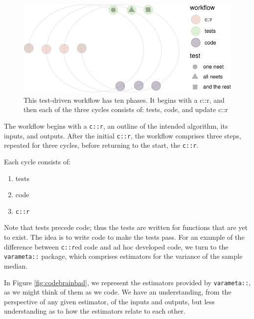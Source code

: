 \documentclass[
]{article}
\providecommand{\tightlist}{%
  \setlength{\itemsep}{0pt}\setlength{\parskip}{0pt}}
\begin{document}
\begin{figure}

{\centering \includegraphics{when-is-done-done_files/figure-latex/workflow-1} 

}

\caption{This test-driven workflow has ten phases. It begins with a c::r, and then each of the three cycles consists of: tests, code, and update c::r}\label{fig:workflow}
\end{figure}

The workflow begins with a \texttt{c::r}, an outline of the intended algorithm, its inputs, and outputs. After the initial \texttt{c::r}, the workflow comprises three steps, repeated for three cycles, before returning to the start, the \texttt{c::r}.

Each cycle consists of:

\begin{enumerate}
\def\labelenumi{\arabic{enumi}.}
\tightlist
\item
  tests
\item
  code
\item
  \texttt{c::r}
\end{enumerate}

Note that tests precede code; thus the tests are written for functions that are yet to exist. The idea is to write code to make the tests pass. For an example of the difference between \texttt{c::r}ed code and ad hoc developed code, we turn to the \texttt{varameta::} package, which comprises estimators for the variance of the sample median.

In Figure \ref{fig:codebrainbad}, we represent the estimators provided by \texttt{varameta::}, as we might think of them as we code. We have an understanding, from the perspective of any given estimator, of the inputs and outputs, but less understanding as to how the estimators relate to each other.
\end{document}
